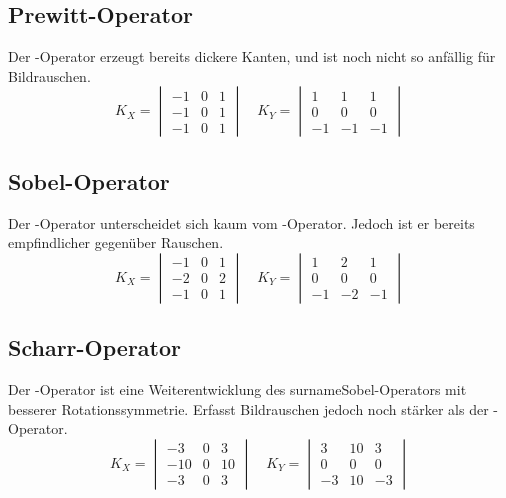 \subsection*{Prewitt-Operator}
Der -Operator \cite[S.~108]{prewitt1070} erzeugt bereits dickere Kanten, und ist noch nicht so anfällig für Bildrauschen.
  \[ K_X = \begin{vmatrix}
       -1 & 0 & 1 \\
       -1 & 0 & 1 \\
       -1 & 0 & 1
     \end{vmatrix}
     \quad
     K_Y = \begin{vmatrix}
        1 &  1 &  1 \\
        0 &  0 &  0 \\
       -1 & -1 & -1
     \end{vmatrix} \]

\subsection*{Sobel-Operator}
Der -Operator \cite[Kap.~5.2]{davies2012} unterscheidet sich kaum vom -Operator.
Jedoch ist er bereits empfindlicher gegenüber Rauschen.
  \[ K_X = \begin{vmatrix}
       -1 & 0 & 1 \\
       -2 & 0 & 2 \\
       -1 & 0 & 1
     \end{vmatrix}
     \quad
     K_Y = \begin{vmatrix}
        1 &  2 &  1 \\
        0 &  0 &  0 \\
       -1 & -2 & -1
     \end{vmatrix} \]

\subsection*{Scharr-Operator}
Der -Operator \cite[Kap.~9.3]{scharr2000} ist eine Weiterentwicklung des surname{Sobel}-Operators mit besserer Rotationssymmetrie.
Erfasst Bildrauschen jedoch noch stärker als der -Operator.
  \[ K_X = \begin{vmatrix}
        -3 & 0 &  3 \\
       -10 & 0 & 10 \\
        -3 & 0 &  3
     \end{vmatrix}
     \quad
     K_Y = \begin{vmatrix}
        3 & 10 &  3 \\
        0 &  0 &  0 \\
       -3 & 10 & -3
     \end{vmatrix} \]


